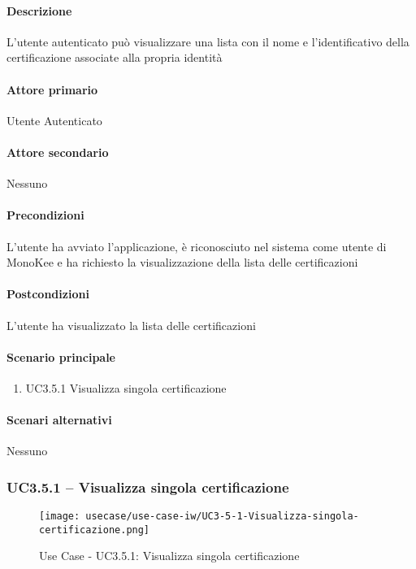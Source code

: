 \paragraph{Descrizione}  L’utente autenticato può visualizzare una lista con il nome e l’identificativo della certificazione associate alla propria identità
\paragraph{Attore primario}  Utente Autenticato
\paragraph{Attore secondario}  Nessuno
\paragraph{Precondizioni}  L’utente ha avviato l’applicazione, è riconosciuto nel sistema come utente di MonoKee e ha richiesto la visualizzazione della lista delle certificazioni
\paragraph{Postcondizioni}  L’utente ha visualizzato la lista delle certificazioni
\paragraph{Scenario principale}  
    \begin{enumerate}
        \item UC3.5.1 Visualizza singola certificazione
    \end{enumerate}
\paragraph{Scenari alternativi}  Nessuno





\subsubsection{UC3.5.1 – Visualizza singola certificazione}
\begin{figure}[!htbp] 
    \centering 
    \texttt{[image: usecase/use-case-iw/UC3-5-1-Visualizza-singola-certificazione.png]} 
    \caption{Use Case - UC3.5.1: Visualizza singola certificazione}
\end{figure}

